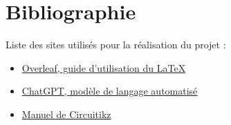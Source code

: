 \documentclass[11pt,a4paper]{article}
\begin{document}
\section{Bibliographie}
Liste des sites utilisés pour la réalisation du projet :
\begin{itemize}
\item \href{https://www.overleaf.com/learn}{Overleaf, guide d'utilisation du \LaTeX{}}
\item \href{https://chat.openai.com/chat}{ChatGPT, modèle de langage automatisé}
\item \href{https://ctan.mines-albi.fr/graphics/pgf/contrib/circuitikz/doc/circuitikzmanual.pdf}{Manuel de Circuitikz}
\end{itemize}
\end{document}
